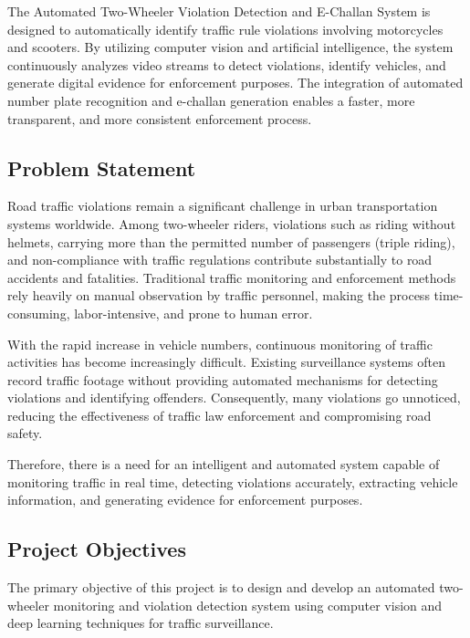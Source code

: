 \documentclass[12pt,a4paper]{article}
\begin{document}
The Automated Two-Wheeler Violation Detection and E-Challan System is designed to automatically identify traffic rule violations involving motorcycles and scooters. By utilizing computer vision and artificial intelligence, the system continuously analyzes video streams to detect violations, identify vehicles, and generate digital evidence for enforcement purposes. The integration of automated number plate recognition and e-challan generation enables a faster, more transparent, and more consistent enforcement process.

\subsection{Problem Statement}
Road traffic violations remain a significant challenge in urban transportation systems worldwide. Among two-wheeler riders, violations such as riding without helmets, carrying more than the permitted number of passengers (triple riding), and non-compliance with traffic regulations contribute substantially to road accidents and fatalities. Traditional traffic monitoring and enforcement methods rely heavily on manual observation by traffic personnel, making the process time-consuming, labor-intensive, and prone to human error.

With the rapid increase in vehicle numbers, continuous monitoring of traffic activities has become increasingly difficult. Existing surveillance systems often record traffic footage without providing automated mechanisms for detecting violations and identifying offenders. Consequently, many violations go unnoticed, reducing the effectiveness of traffic law enforcement and compromising road safety.

Therefore, there is a need for an intelligent and automated system capable of monitoring traffic in real time, detecting violations accurately, extracting vehicle information, and generating evidence for enforcement purposes.

\subsection{Project Objectives}
The primary objective of this project is to design and develop an automated two-wheeler monitoring and violation detection system using computer vision and deep learning techniques for traffic surveillance.
\end{document}
